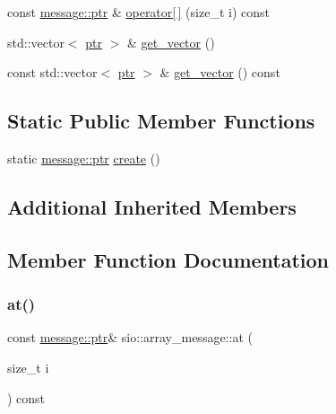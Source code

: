 \begin{DoxyCompactItemize}
\item 
const \hyperlink{classsio_1_1message_a6340b6fef57e4516eb17928b1885a615}{message\+::ptr} \& \hyperlink{classsio_1_1array__message_a4643f17c6f0fca23cd8c2c1d359d362d}{operator\mbox{[}$\,$\mbox{]}} (size\+\_\+t i) const
\item 
std\+::vector$<$ \hyperlink{classsio_1_1message_a6340b6fef57e4516eb17928b1885a615}{ptr} $>$ \& \hyperlink{classsio_1_1array__message_a7d039c4e78bb01f5e19921e0f09509c2}{get\+\_\+vector} ()
\item 
const std\+::vector$<$ \hyperlink{classsio_1_1message_a6340b6fef57e4516eb17928b1885a615}{ptr} $>$ \& \hyperlink{classsio_1_1array__message_a298e6b4d041e95ac5b90cdff6fdef5fb}{get\+\_\+vector} () const
\end{DoxyCompactItemize}
\subsection*{Static Public Member Functions}
\begin{DoxyCompactItemize}
\item 
static \hyperlink{classsio_1_1message_a6340b6fef57e4516eb17928b1885a615}{message\+::ptr} \hyperlink{classsio_1_1array__message_ae39847edc10bcfc748257485a57382f5}{create} ()
\end{DoxyCompactItemize}
\subsection*{Additional Inherited Members}


\subsection{Member Function Documentation}
\mbox{\label{classsio_1_1array__message_a97aba94eb40546998c86ed6901a8f331}} 
\subsubsection{\texorpdfstring{at()}{at()}}
{\footnotesize\ttfamily const \hyperlink{classsio_1_1message_a6340b6fef57e4516eb17928b1885a615}{message\+::ptr}\& sio\+::array\+\_\+message\+::at (\begin{DoxyParamCaption}\item[{size\+\_\+t}]{i }\end{DoxyParamCaption}) const\hspace{0.3cm}{\ttfamily [inline]}}

